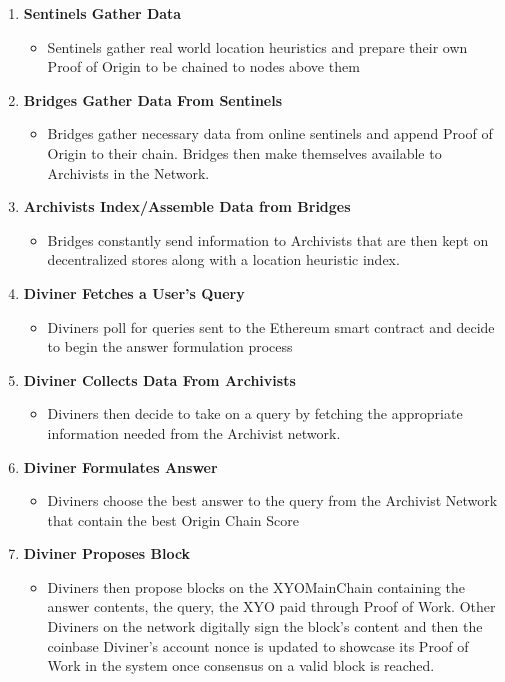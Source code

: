\documentclass{article}
\begin{document}
\begin{enumerate}
  \item \textbf{Sentinels Gather Data}
  \begin{itemize}
    \item Sentinels gather real world location heuristics and prepare their own Proof of Origin to be chained to nodes above them
  \end{itemize}
  \item \textbf{Bridges Gather Data From Sentinels}
  \begin{itemize}
    \item Bridges gather necessary data from online sentinels and append Proof of Origin to their chain. Bridges then make themselves available to Archivists in the Network.
  \end{itemize}
  \item \textbf{Archivists Index/Assemble Data from Bridges}
  \begin{itemize}
    \item Bridges constantly send information to Archivists that are then kept on decentralized stores along with a location heuristic index.
  \end{itemize}
  \item \textbf{Diviner Fetches a User's Query}
  \begin{itemize}
    \item Diviners poll for queries sent to the Ethereum smart contract and decide to begin the answer formulation process
  \end{itemize}
  \item \textbf{Diviner Collects Data From Archivists}
  \begin{itemize}
    \item  Diviners then decide to take on a query by fetching the appropriate information needed from the Archivist network.
  \end{itemize}
  \item \textbf{Diviner Formulates Answer}
  \begin{itemize}
    \item Diviners choose the best answer to the query from the Archivist Network that contain the best Origin Chain Score
  \end{itemize}
  \item \textbf{Diviner Proposes Block}
  \begin{itemize}
    \item Diviners then propose blocks on the XYOMainChain containing the answer contents, the query, the XYO paid through Proof of Work. Other Diviners on the network digitally sign the block's content and then the coinbase Diviner's account nonce is updated to showcase its Proof of Work in the system once consensus on a valid block is reached.

\end{itemize}
\end{enumerate}
\end{document}
